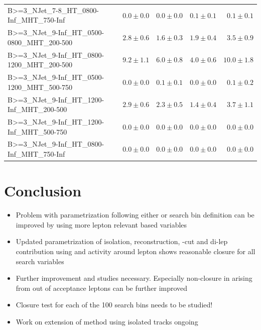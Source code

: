 \documentclass{beamer}
\begin{document}
\begin{frame}
\begin{tabular}{lrrrr}
      B>=3\_NJet\_7-8\_HT\_0800-Inf\_MHT\_750-Inf &               $0.0\pm0.0$&               $0.0\pm0.0$&               $0.1\pm0.1$&                   $0.1\pm0.1$ \\ 
   B>=3\_NJet\_9-Inf\_HT\_0500-0800\_MHT\_200-500 &               $2.8\pm0.6$&               $1.6\pm0.3$&               $1.9\pm0.4$&                   $3.5\pm0.9$ \\ 
   B>=3\_NJet\_9-Inf\_HT\_0800-1200\_MHT\_200-500 &               $9.2\pm1.1$&               $6.0\pm0.8$&               $4.0\pm0.6$&                  $10.0\pm1.8$ \\ 
   B>=3\_NJet\_9-Inf\_HT\_0500-1200\_MHT\_500-750 &               $0.0\pm0.0$&               $0.1\pm0.1$&               $0.0\pm0.0$&                   $0.1\pm0.2$ \\ 
    B>=3\_NJet\_9-Inf\_HT\_1200-Inf\_MHT\_200-500 &               $2.9\pm0.6$&               $2.3\pm0.5$&               $1.4\pm0.4$&                   $3.7\pm1.1$ \\ 
    B>=3\_NJet\_9-Inf\_HT\_1200-Inf\_MHT\_500-750 &               $0.0\pm0.0$&               $0.0\pm0.0$&               $0.0\pm0.0$&                   $0.0\pm0.0$ \\ 
    B>=3\_NJet\_9-Inf\_HT\_0800-Inf\_MHT\_750-Inf &               $0.0\pm0.0$&               $0.0\pm0.0$&               $0.0\pm0.0$&                   $0.0\pm0.0$ \\ 


\bottomrule 
\end{tabular}
\end{frame}





\section{Conclusion}
\begin{frame}
 \begin{itemize}
 \item Problem with parametrization following either \NJets or \BTags search bin definition can be improved by using more lepton relevant based variables
 \item Updated parametrization of isolation, reconstruction, \mt-cut and di-lep contribution using \pt and activity around lepton shows reasonable closure for all search variables
 \item Further improvement and studies necessary. Especially non-closure in \NJets arising from out of acceptance leptons can be further improved
 \item Closure test for each of the 100 search bins needs to be studied!
 \item Work on extension of method using isolated tracks ongoing
 \end{itemize}

\end{frame}
\end{document}
